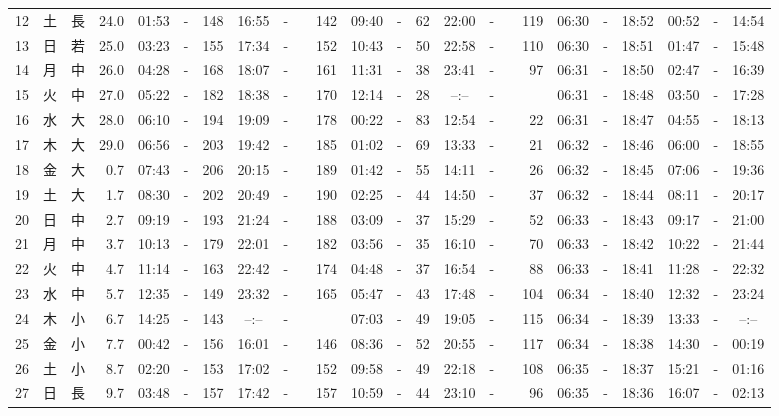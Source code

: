 \documentclass[12pt,a4j]{jsarticle}
\begin{document}
\begin{table}[htbp]
\begin{center}
{\begin{tabular}{|rc|cr|ccrccr|ccrccr|ccc|ccc|}
12 & 土 & 長 & 24.0 &  01:53 &-& 148 &  16:55 &-& 142 &  09:40 &-&  62 &  22:00 &-& 119 & 06:30 & -& 18:52 & 00:52 & -& 14:54 \\
13 & 日 & 若 & 25.0 &  03:23 &-& 155 &  17:34 &-& 152 &  10:43 &-&  50 &  22:58 &-& 110 & 06:30 & -& 18:51 & 01:47 & -& 15:48 \\
14 & 月 & 中 & 26.0 &  04:28 &-& 168 &  18:07 &-& 161 &  11:31 &-&  38 &  23:41 &-&  97 & 06:31 & -& 18:50 & 02:47 & -& 16:39 \\
15 & 火 & 中 & 27.0 &  05:22 &-& 182 &  18:38 &-& 170 &  12:14 &-&  28 &  --:-- &-&~~~~~ & 06:31 & -& 18:48 & 03:50 & -& 17:28 \\
16 & 水 & 大 & 28.0 &  06:10 &-& 194 &  19:09 &-& 178 &  00:22 &-&  83 &  12:54 &-&  22 & 06:31 & -& 18:47 & 04:55 & -& 18:13 \\
17 & 木 & 大 & 29.0 &  06:56 &-& 203 &  19:42 &-& 185 &  01:02 &-&  69 &  13:33 &-&  21 & 06:32 & -& 18:46 & 06:00 & -& 18:55 \\
18 & 金 & 大 &  0.7 &  07:43 &-& 206 &  20:15 &-& 189 &  01:42 &-&  55 &  14:11 &-&  26 & 06:32 & -& 18:45 & 07:06 & -& 19:36 \\
19 & 土 & 大 &  1.7 &  08:30 &-& 202 &  20:49 &-& 190 &  02:25 &-&  44 &  14:50 &-&  37 & 06:32 & -& 18:44 & 08:11 & -& 20:17 \\
20 & 日 & 中 &  2.7 &  09:19 &-& 193 &  21:24 &-& 188 &  03:09 &-&  37 &  15:29 &-&  52 & 06:33 & -& 18:43 & 09:17 & -& 21:00 \\
21 & 月 & 中 &  3.7 &  10:13 &-& 179 &  22:01 &-& 182 &  03:56 &-&  35 &  16:10 &-&  70 & 06:33 & -& 18:42 & 10:22 & -& 21:44 \\
22 & 火 & 中 &  4.7 &  11:14 &-& 163 &  22:42 &-& 174 &  04:48 &-&  37 &  16:54 &-&  88 & 06:33 & -& 18:41 & 11:28 & -& 22:32 \\
23 & 水 & 中 &  5.7 &  12:35 &-& 149 &  23:32 &-& 165 &  05:47 &-&  43 &  17:48 &-& 104 & 06:34 & -& 18:40 & 12:32 & -& 23:24 \\
24 & 木 & 小 &  6.7 &  14:25 &-& 143 &  --:-- &-&~~~~~ &  07:03 &-&  49 &  19:05 &-& 115 & 06:34 & -& 18:39 & 13:33 & -& --:-- \\
25 & 金 & 小 &  7.7 &  00:42 &-& 156 &  16:01 &-& 146 &  08:36 &-&  52 &  20:55 &-& 117 & 06:34 & -& 18:38 & 14:30 & -& 00:19 \\
26 & 土 & 小 &  8.7 &  02:20 &-& 153 &  17:02 &-& 152 &  09:58 &-&  49 &  22:18 &-& 108 & 06:35 & -& 18:37 & 15:21 & -& 01:16 \\
27 & 日 & 長 &  9.7 &  03:48 &-& 157 &  17:42 &-& 157 &  10:59 &-&  44 &  23:10 &-&  96 & 06:35 & -& 18:36 & 16:07 & -& 02:13 \\

\end{tabular}}
\end{center}
\end{table}
\end{document}
